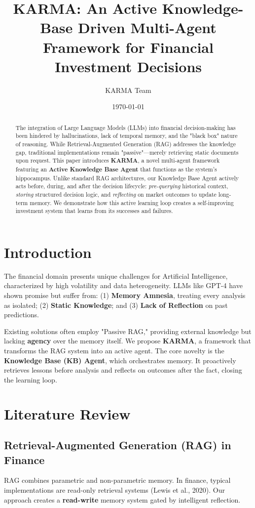 \documentclass[11pt, a4paper]{article}
\title{\textbf{KARMA: An Active Knowledge-Base Driven Multi-Agent Framework for Financial Investment Decisions}}
\author{KARMA Team}
\date{\today}
\begin{document}
\maketitle

\begin{abstract}
The integration of Large Language Models (LLMs) into financial decision-making has been hindered by hallucinations, lack of temporal memory, and the "black box" nature of reasoning. While Retrieval-Augmented Generation (RAG) addresses the knowledge gap, traditional implementations remain "passive"—merely retrieving static documents upon request. This paper introduces \textbf{KARMA}, a novel multi-agent framework featuring an \textbf{Active Knowledge Base Agent} that functions as the system's hippocampus. Unlike standard RAG architectures, our Knowledge Base Agent actively acts before, during, and after the decision lifecycle: \textit{pre-querying} historical context, \textit{storing} structured decision logic, and \textit{reflecting} on market outcomes to update long-term memory. We demonstrate how this active learning loop creates a self-improving investment system that learns from its successes and failures.
\end{abstract}

\section{Introduction}

The financial domain presents unique challenges for Artificial Intelligence, characterized by high volatility and data heterogeneity. LLMs like GPT-4 have shown promise but suffer from: (1) \textbf{Memory Amnesia}, treating every analysis as isolated; (2) \textbf{Static Knowledge}; and (3) \textbf{Lack of Reflection} on past predictions.

Existing solutions often employ "Passive RAG," providing external knowledge but lacking \textbf{agency} over the memory itself. We propose \textbf{KARMA}, a framework that transforms the RAG system into an active agent. The core novelty is the \textbf{Knowledge Base (KB) Agent}, which orchestrates memory. It proactively retrieves lessons before analysis and reflects on outcomes after the fact, closing the learning loop.

\section{Literature Review}

\subsection{Retrieval-Augmented Generation (RAG) in Finance}
RAG combines parametric and non-parametric memory. In finance, typical implementations are read-only retrieval systems (Lewis et al., 2020). Our approach creates a \textbf{read-write} memory system gated by intelligent reflection.
\end{document}
